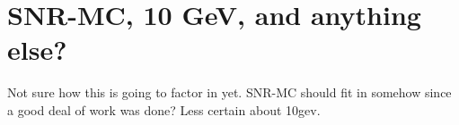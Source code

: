 \chapter{SNR-MC, 10 GeV, and anything else?}
\label{chap:other}

Not sure how this is going to factor in yet. SNR-MC should fit in somehow since a good deal of work was done? Less certain about 10gev. 